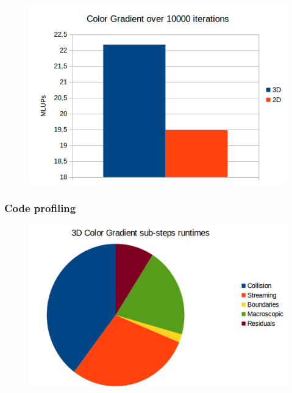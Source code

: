 \documentclass[xcolor=table]{beamer}
\begin{document}
\begin{frame}
\begin{textblock*}{5cm}
\begin{figure}
									\centering
									\includegraphics[scale=0.43]{Resources/performance.png}
								\end{figure}
							\end{textblock*}
							
				\end{frame}
				\begin{frame}
					\frametitle{Code profiling}
						\begin{figure}[l]
							\centering
							\includegraphics[scale=0.3]{Resources/3Dprofile.png}
						\end{figure}
				\end{frame}
\end{document}
